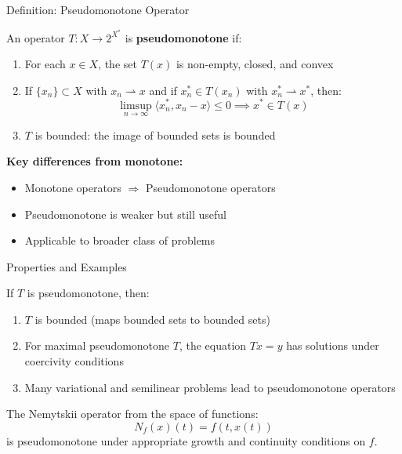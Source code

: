 \documentclass[aspectratio=169,10pt]{beamer}
\begin{document}
\begin{frame}{Definition: Pseudomonotone Operator}

\begin{definition}
An operator $T : X \to 2^{X^*}$ is \textbf{pseudomonotone} if:

\begin{enumerate}
\item For each $x \in X$, the set $T(x)$ is non-empty, closed, and convex

\item If $\{x_n\} \subset X$ with $x_n \rightharpoonup x$ and if $x_n^* \in T(x_n)$ with $x_n^* \rightharpoonup x^*$, then:
$$\limsup_{n \to \infty} \langle x_n^*, x_n - x \rangle \leq 0 \implies x^* \in T(x)$$

\item $T$ is bounded: the image of bounded sets is bounded
\end{enumerate}
\end{definition}

\vspace{0.3cm}

\textbf{Key differences from monotone:}
\begin{itemize}
\item Monotone operators $\Rightarrow$ Pseudomonotone operators
\item Pseudomonotone is weaker but still useful
\item Applicable to broader class of problems
\end{itemize}

\end{frame}

\begin{frame}[allowframebreaks]{Properties and Examples}

\begin{theorem}
If $T$ is pseudomonotone, then:
\begin{enumerate}
\item $T$ is bounded (maps bounded sets to bounded sets)
\item For maximal pseudomonotone $T$, the equation $Tx = y$ has solutions under coercivity conditions
\item Many variational and semilinear problems lead to pseudomonotone operators
\end{enumerate}
\end{theorem}

\vspace{0.3cm}

\begin{example}
The Nemytskii operator from the space of functions:
$$N_f(x)(t) = f(t, x(t))$$
is pseudomonotone under appropriate growth and continuity conditions on $f$.
\end{example}

\end{frame}
\end{document}
